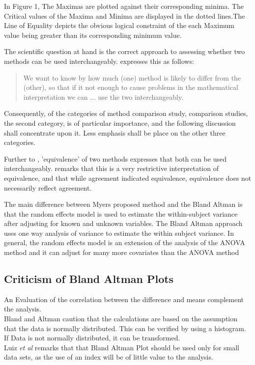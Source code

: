 \documentclass[12pt, a4paper]{report}
\begin{document}
In Figure 1,  The Maximas are plotted against their corresponding
minima. The Critical values of the Maxima and Minima are displayed
in the dotted lines.The Line of Equality depicts the obvious
logical constraint of the each Maximum value being greater than
its corresponding minimum value.



The scientific question at hand is the correct approach to
assessing whether two methods can be used interchangeably.
\citet{BA99} expresses this as follows:
\begin{quote}We want to
know by how much (one) method is likely to differ from the
(other), so that if it not enough to cause problems in the
mathematical interpretation we can ... use the two
interchangeably.
\end{quote}



Consequently, of the categories of method comparison study,
comparison studies, the second category, is of particular
importance, and the following discussion shall concentrate upon
it. Less emphasis shall be place on the other three categories.

 \bigskip Further to \citet{BA86}, 'equivalence' of two methods expresses
 that both can be used interchangeably.
\citet[p.49]{DunnSEME} remarks that this is a very restrictive
interpretation of equivalence, and that while agreement indicated
equivalence, equivalence does not necessarily reflect agreement.

The main difference between Myers proposed method and the Bland
Altman is that the random effects model is used to estimate the
within-subject variance after adjusting for known and unknown
variables. The Bland Altman approach uses one way analysis of
variance to estimate the within subject variance. In general, the
random effects model is an extension of the analysis of the ANOVA
method and it can adjust for many more covariates than the ANOVA
method



\subsection{Criticism of Bland Altman Plots}

An Evaluation of the correlation between the difference and means
complement the analysis.
\\
Bland and Altman caution that the calculations are based on the
assumption that the data is normally distributed. This can be
verified by using a histogram. If Data is not normally
distributed, it can be transformed.
\\
Luiz \emph{et al} remarks that that Bland Altman Plot should be
used only for small data sets, as the use of an index will be of
little value to the analysis.
\end{document}
